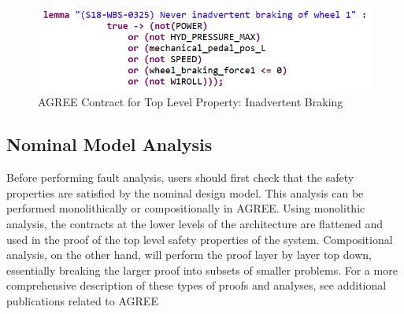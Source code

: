 \begin{figure}[htbp]
	\begin{center}
		\includegraphics[width=.7\textwidth]{images/inadvertent_braking.png}
	\end{center}
	\vspace{-0.3in}
	\caption{AGREE Contract for Top Level Property: Inadvertent Braking}
	\label{fig:inadvertent_braking}
\end{figure}

\subsection{Nominal Model Analysis}
Before performing fault analysis, users should first check that the safety properties are satisfied by the nominal design model. This analysis can be performed monolithically or compositionally in AGREE. Using monolithic analysis, the contracts at the lower levels of the architecture are flattened and used in the proof of the top level safety properties of the system. Compositional analysis, on the other hand, will perform the proof layer by layer top down, essentially breaking the larger proof into subsets of smaller problems. For a more comprehensive description of these types of proofs and analyses, see additional publications related to AGREE \cite{cofer2012compositional,QFCS15:backes} 

